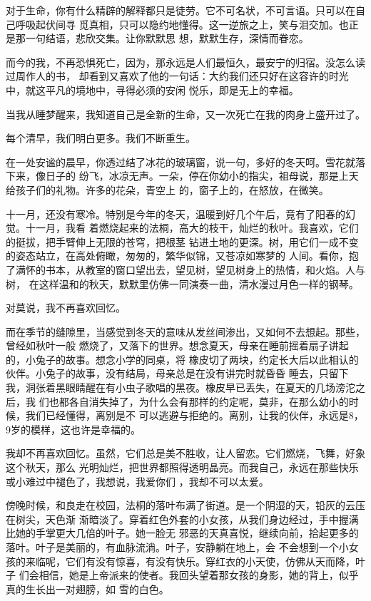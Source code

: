 \documentclass[12pt,a4paper]{article}
\begin{document}
		对于生命，你有什么精辟的解释都只是徒劳。它不可名状，不可言语。只可以在自己呼吸起伏间寻
	觅真相，只可以隐约地懂得。这一逆旅之上，笑与泪交加。也正是那一句结语，悲欣交集。让你默默思
	想，默默生存，深情而眷恋。

		而今的我，不再恐惧死亡，因为，那永远是人们最恒久，最安宁的归宿。没怎么读过周作人的书，
	却看到又喜欢了他的一句话：大约我们还只好在这容许的时光中，就这平凡的境地中，寻得必须的安闲
	悦乐，即是无上的幸福。

		当我从睡梦醒来，我知道自己是全新的生命，又一次死亡在我的肉身上盛开过了。

		每个清早，我们明白更多。我们不断重生。

	\endwriting



		在一处安谧的晨早，你透过结了冰花的玻璃窗，说一句，多好的冬天呵。雪花就落下来，像日子的
	纷飞，冰凉无声。一朵，停在你幼小的指尖，祖母说，那是上天给孩子们的礼物。许多的花朵，青空上
	的，窗子上的，在怒放，在微笑。


		十一月，还没有寒冷。特别是今年的冬天，温暖到好几个午后，竟有了阳春的幻觉。十一月，我看
	着燃烧起来的法桐，高大的枝干，灿烂的秋叶。我喜欢，它们的挺拔，把手臂伸上无限的苍穹，把根茎
	钻进土地的更深。树，用它们一成不变的姿态站立，在高处俯瞰，匆匆的，繁华似锦，又苍凉如寒梦的
	人间。看你，抱了满怀的书本，从教室的窗口望出去，望见树，望见树身上的热情，和火焰。人与树，
	在这样温和的秋天，默默里仿佛一同演奏一曲，清水漫过月色一样的钢琴。


		对莫说，我不再喜欢回忆。

		而在季节的缝隙里，当感觉到冬天的意味从发丝间渗出，又如何不去想起。那些，曾经如秋叶一般
	燃烧了，又落下的世界。想念夏天，母亲在睡前摇着扇子讲起的，小兔子的故事。想念小学的同桌，将
	橡皮切了两块，约定长大后以此相认的伙伴。小兔子的故事，没有结局，母亲总是在没有讲完时就昏昏
	睡去，只留下我，洞张着黑眼睛醒在有小虫子歌唱的黑夜。橡皮早已丢失，在夏天的几场滂沱之后，我
	们也都各自消失掉了，为什么会有那样的约定呢，莫非，在那么幼小的时候，我们已经懂得，离别是不
	可以逃避与拒绝的。离别，让我的伙伴，永远是8，9岁的模样，这也许是幸福的。

		我却不再喜欢回忆。虽然，它们总是美不胜收，让人留恋。它们燃烧，飞舞，好象这个秋天，那么
	光明灿烂，把世界都照得透明晶亮。而我自己，永远在那些快乐或小难过中褪色了，我想说，我爱你们
	，我却不可以太爱。


		傍晚时候，和良走在校园，法桐的落叶布满了街道。是一个阴湿的天，铅灰的云压在树尖，天色渐
	渐暗淡了。穿着红色外套的小女孩，从我们身边经过，手中握满比她的手掌更大几倍的叶子。她一脸无
	邪恶的天真喜悦，继续向前，拾起更多的落叶。叶子是美丽的，有血脉流淌。叶子，安静躺在地上，会
	不会想到一个小女孩的来临呢，它们有没有惊喜，有没有快乐。穿红衣的小天使，仿佛从天而降，叶子
	们会相信，她是上帝派来的使者。我回头望着那女孩的身影，她的背上，似乎真的生长出一对翅膀，如
	雪的白色。
\end{document}
